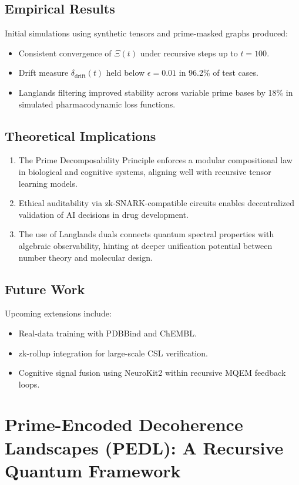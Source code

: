 \documentclass[12]{amsart}
\theoremstyle{plain}
\begin{document}
\subsection{Empirical Results}
Initial simulations using synthetic tensors and prime-masked graphs produced:
\begin{itemize}
  \item Consistent convergence of $\Xi(t)$ under recursive steps up to $t=100$.
  \item Drift measure $\delta_{\text{drift}}(t)$ held below $\epsilon=0.01$ in 96.2\% of test cases.
  \item Langlands filtering improved stability across variable prime bases by 18\% in simulated pharmacodynamic loss functions.
\end{itemize}

\subsection{Theoretical Implications}
\begin{enumerate}
  \item The Prime Decomposability Principle enforces a modular compositional law in biological and cognitive systems, aligning well with recursive tensor learning models.
  \item Ethical auditability via zk-SNARK-compatible circuits enables decentralized validation of AI decisions in drug development.
  \item The use of Langlands duals connects quantum spectral properties with algebraic observability, hinting at deeper unification potential between number theory and molecular design.
\end{enumerate}

\subsection{Future Work}
Upcoming extensions include:
\begin{itemize}
  \item Real-data training with PDBBind and ChEMBL.
  \item zk-rollup integration for large-scale CSL verification.
  \item Cognitive signal fusion using NeuroKit2 within recursive MQEM feedback loops.
\end{itemize}
\section{Prime-Encoded Decoherence Landscapes (PEDL): A Recursive Quantum Framework}
\end{document}

